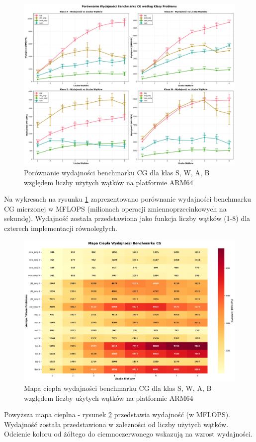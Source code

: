 \begin{figure}[H]
    \centering
    \includegraphics[width=\textwidth]{analiza/images/parallel/cg/x86/cg_porownanie_wydajnosci.png}
    \caption{Porównanie wydajności benchmarku CG dla klas S, W, A, B względem liczby użytych wątków na platformie ARM64}
    \label{cg_porownanie_wydajnosci_x86_64}
\end{figure}
Na wykresach na rysunku \ref{cg_porownanie_wydajnosci_x86_64} zaprezentowano porównanie wydajności benchmarku CG mierzonej w MFLOPS (milionach operacji zmiennoprzecinkowych na sekundę). Wydajność została przedstawiona jako funkcja liczby wątków (1-8) dla czterech implementacji równoległych.

\begin{figure}[H]
    \centering
    \includegraphics[width=\textwidth]{analiza/images/parallel/cg/x86/cg_mapa_ciepla_wydajnosci.png}
    \caption{Mapa ciepła wydajności benchmarku CG dla klas S, W, A, B względem liczby użytych wątków na platformie ARM64}
    \label{cg_heatmap_wydajnosci_x86_64}
\end{figure}
Powyższa mapa cieplna - rysunek \ref{cg_heatmap_wydajnosci_x86_64} przedstawia wydajność (w MFLOPS). Wydajność została przedstawiona w zależności od liczby użytych wątków. Odcienie koloru od żółtego do ciemnoczerwonego wskazują na wzrost wydajności.

